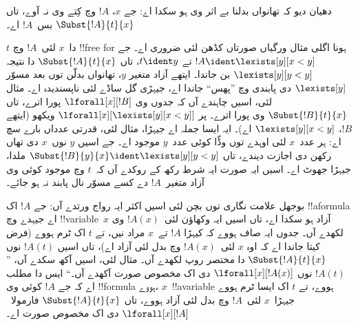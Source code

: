 \documentclass[../../../include/open-logic-section]{subfiles}
\begin{document}
\begin{explain}
دھیان دیو کہ تھانواں بدلنا بے اثر وی ہو سکدا اے:
جے $x$، $!A$ وچ کِتے وی نہ آوے، تاں
$\Subst{!A}{t}{x}$ بس~$!A$ اے۔

$t$ دا~$x$ لئی~$!A$ وچ !!{free for} ہونا
اگلی مثال ورگیاں صورتاں کڈھن لئی ضروری اے۔
جے $!A \ident \lexists[y][x < y]$
تے $t \ident y$، تاں $\Subst{!A}{t}{x}$
دا نتیجہ $\lexists[y][y <
  y]$ بن جاندا۔ ایتھے آزاد متغیر $y$،
تھانواں بدلّن توں بعد مسوّر $\lexists[y]$ دی
پابندی وچ ”پھس“ جاندا اے، جیہڑی گل ساڈے لئی
ناپسندیدہ اے۔ مثال لئی، اسیں چاہندے آں کہ
جدوں وی $\lforall[x][!B]$ پورا اترے، تاں
$\Subst{!B}{t}{x}$ وی پورا اترے۔ پر
$\lforall[x][\lexists[y][x < y]]$ ویکھو
(ایتھے $!B$، $\lexists[y][x <
  y]$ اے)۔ ایہ ایسا جملہ اے جیہڑا، مثال لئی،
قدرتی عدداں بارے سچ اے: ہر عدد~$x$ لئی اوہدے
توں وڈّا کوئی عدد~$y$ موجود اے۔ جے اسیں
$y$ نوں~$x$ دی تھاں رکھن دی اجازت دیندے،
تاں $\Subst{!B}{y}{x} \ident \lexists[y][y < y]$
ملدا، جیہڑا جھوٹ اے۔ اسیں ایہ صورت
ایہ شرط رکھ کے روکدے آں کہ~$t$ وچ موجود
کوئی وی آزاد متغیر~$!A$ دے کسے مسوّر نال
پابند نہ ہو جائے۔
\end{explain}

بوجھل علامت نگاری توں بچن لئی اسیں اکثر ایہ رواج
ورتدے آں: جے $!A$ اک !!a{formula} اے جیہدے وچ
!!{variable}~$x$ آزاد ہو سکدا اے، تاں
اسیں ایہ وکھاؤن لئی~$!A(x)$ وی لکھدے آں۔
جدوں ایہ صاف ہووے کہ کیہڑا $!A$ تے~$x$
مراد نیں، تے $t$ اک ٹرم ہووے (فرض کیتا
جاندا اے کہ اوہ $x$ لئی~$!A(x)$ وچ بدل لئی
آزاد اے)، تاں اسیں $!A(t)$ نوں
$\Subst{!A}{t}{x}$ دا مختصر روپ لکھدے آں۔
مثال لئی، اسیں آکھ سکدے آں، ”$!A(t)$ نوں
$\lforall[x][!A(x)]$ دی اک مخصوص صورت آکھدے آں۔“
ایس دا مطلب اے کہ جے $!A$ کوئی وی
!!{formula} ہووے، $x$~!!a{variable} ہووے،
تے $t$ اک ایسا ٹرم ہووے جیہڑا~$x$ لئی~$!A$ وچ
بدل لئی آزاد ہووے، تاں $\Subst{!A}{t}{x}$
فارمولا~$\lforall[x][!A]$ دی اک مخصوص صورت اے۔
\end{document}
